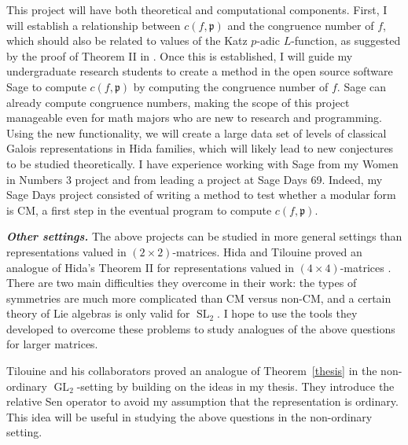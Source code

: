 \documentclass[12pt]{article}
\newcommand{\p}{\mathfrak{p}}
\theoremstyle{definition}
\DeclareMathOperator{\GL}{GL}
\DeclareMathOperator{\SL}{SL}
\begin{document}
This project will have both theoretical and computational components.  First, I will establish a relationship between $c(f, \p)$ and the congruence number of $f$, which should also be related to values of the Katz $p$-adic $L$-function, as suggested by the proof of Theorem II in \cite{Hida15}.  Once this is established, I will guide my undergraduate research students to create a method in the open source software Sage \cite{SAGE} to compute $c(f, \p)$ by computing the congruence number of $f$.  Sage can already compute congruence numbers, making the scope of this project manageable  even for math majors who are new to research and programming.  Using the new functionality, we will create a large data set of levels of classical Galois representations in Hida families, which will likely lead to new conjectures to be studied theoretically.  I have experience working with Sage from my Women in Numbers 3 project \cite{BCLMN15} and from leading a project at Sage Days 69.  Indeed, my Sage Days project consisted of writing a method to test whether a modular form is CM, a first step in the eventual program to compute $c(f, \p)$.  

\textit{\textbf{Other settings.}}  The above projects can be studied in more general settings than representations valued in $(2 \times 2)$-matrices.  Hida and Tilouine proved an analogue of Hida's Theorem II \cite{Hida15} for representations valued in $(4 \times 4)$-matrices \cite{HidaTilouine15}.  There are two main difficulties they overcome in their work: the types of symmetries are much more complicated than CM versus non-CM, and a certain theory of Lie algebras is only valid for $\SL_2$.  I hope to use the tools they developed to overcome these problems to study analogues of the above questions for larger matrices.  

Tilouine and his collaborators proved an analogue of Theorem~\ref{thesis} in the non-ordinary $\GL_2$-setting \cite{CIT15} by building on the ideas in my thesis.  They introduce the relative Sen operator to avoid my assumption that the representation is ordinary.  This idea will be useful in studying the above questions in the non-ordinary setting. 

{}

\end{document}
